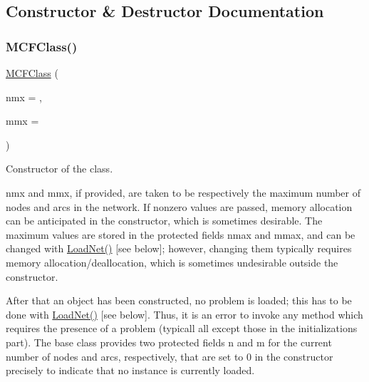 \subsection{Constructor \& Destructor Documentation}
\mbox{\label{class_m_c_f_class_ac598fb1a423b3b722414a53c8549953c}} 
\subsubsection{\texorpdfstring{M\+C\+F\+Class()}{MCFClass()}}
{\footnotesize\ttfamily \mbox{\hyperlink{class_m_c_f_class}{M\+C\+F\+Class}} (\begin{DoxyParamCaption}\item[{\mbox{\hyperlink{class_m_c_f_class_a76aaabb20535c51a2752b93f6c38fe54}{c\+Index}}}]{nmx = {},  }\item[{\mbox{\hyperlink{class_m_c_f_class_a76aaabb20535c51a2752b93f6c38fe54}{c\+Index}}}]{mmx = {} }\end{DoxyParamCaption})\hspace{0.3cm}{\ttfamily [inline]}}

Constructor of the class.

nmx and mmx, if provided, are taken to be respectively the maximum number of nodes and arcs in the network. If nonzero values are passed, memory allocation can be anticipated in the constructor, which is sometimes desirable. The maximum values are stored in the protected fields nmax and mmax, and can be changed with \mbox{\hyperlink{class_m_c_f_class_a8d82d26f7845eb69081c860e14c3dc4c}{Load\+Net()}} \mbox{[}see below\mbox{]}; however, changing them typically requires memory allocation/deallocation, which is sometimes undesirable outside the constructor.

After that an object has been constructed, no problem is loaded; this has to be done with \mbox{\hyperlink{class_m_c_f_class_a8d82d26f7845eb69081c860e14c3dc4c}{Load\+Net()}} \mbox{[}see below\mbox{]}. Thus, it is an error to invoke any method which requires the presence of a problem (typicall all except those in the initializations part). The base class provides two protected fields n and m for the current number of nodes and arcs, respectively, that are set to 0 in the constructor precisely to indicate that no instance is currently loaded. \mbox{\label{class_m_c_f_class_a93c0882740d38b9f8eb05994a01f76b7}} 
